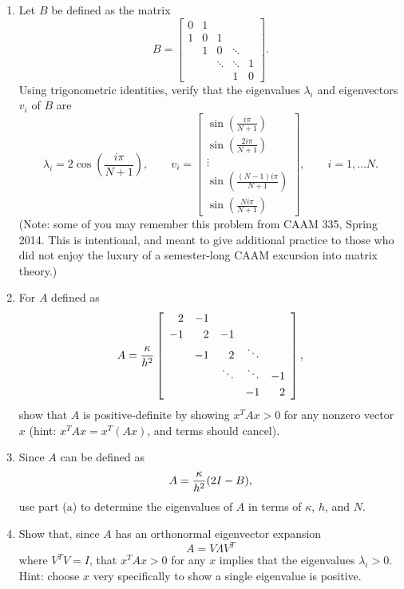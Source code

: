 \begin{enumerate}
\item Let $B$ be defined as the matrix
\[
B =  \left[\begin{array}{rrrrr}
              0 & 1 \\[0.25em]
               1 & 0 & 1 \\
                 &  1  & 0 & \ddots \\
                 & & \ddots & \ddots & 1 \\[0.25em]
                 & & & 1 & 0 
               \end{array}\right].
\]
Using trigonometric identities, verify that the eigenvalues $\lambda_i$  and eigenvectors $v_i$ of $B$ are
\[
\lambda_i = 2\cos\left(\frac{i \pi}{N+1}\right), \qquad v_i = \left[\begin{array}{c}
\sin\left(\frac{i\pi}{N+1}\right)\\
\sin\left(\frac{2i\pi}{N+1}\right)\\
\vdots\\
\sin\left(\frac{(N-1)i \pi}{N+1}\right)\\
\sin\left(\frac{N i \pi}{N+1}\right)
\end{array}\right], \qquad i = 1,\ldots N.
\]
(Note: some of you may remember this problem from CAAM 335, Spring 2014. This is intentional, and meant to give additional practice to those who did not enjoy the luxury of a semester-long CAAM excursion into matrix theory.)

\item For $A$ defined as
\[
A = {\kappa\over h^2} \left[\begin{array}{rrrrr}
              2 & -1 \\[0.25em]
               -1 & 2 & -1 \\
                 &  -1  & 2 & \ddots \\
                 & & \ddots & \ddots & -1 \\[0.25em]
                 & & & -1 & 2 
               \end{array}\right],
\]
show that $A$ is positive-definite by showing $x^TAx > 0$ for any nonzero vector $x$ (hint: $x^TAx = x^T(Ax)$, and terms should cancel). 

\item Since $A$ can be defined as
\[
A = {\kappa \over h^2}(2I - B),
\] 
use part (a) to determine the eigenvalues of $A$ in terms of $\kappa$, $h$, and $N$.

\item Show that, since $A$ has an orthonormal eigenvector expansion
\[
A = V\Lambda V^T
\]
where $V^TV = I$, that $x^TAx > 0$ for any $x$ implies that the eigenvalues $\lambda_i > 0$.  Hint: choose $x$ very specifically to show a single eigenvalue is positive.  
\end{enumerate}

